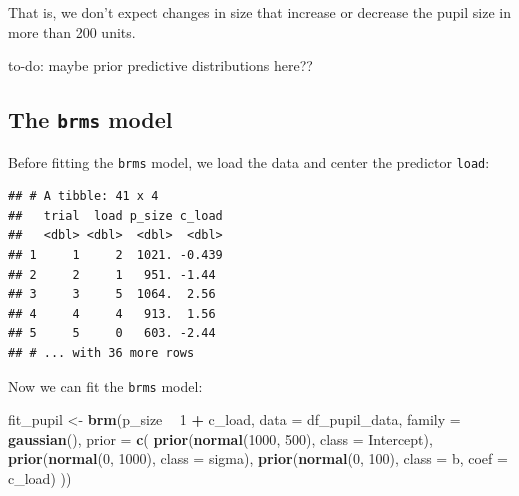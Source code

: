 \documentclass[12pt,]{krantz}
\newenvironment{Shaded}{\begin{snugshade}}{\end{snugshade}}
\newcommand{\DataTypeTok}[1]{\textcolor[rgb]{0.13,0.29,0.53}{#1}}
\newcommand{\DecValTok}[1]{\textcolor[rgb]{0.00,0.00,0.81}{#1}}
\newcommand{\KeywordTok}[1]{\textcolor[rgb]{0.13,0.29,0.53}{\textbf{#1}}}
\newcommand{\NormalTok}[1]{#1}
\newcommand{\OperatorTok}[1]{\textcolor[rgb]{0.81,0.36,0.00}{\textbf{#1}}}
\newcommand{\StringTok}[1]{\textcolor[rgb]{0.31,0.60,0.02}{#1}}
\theoremstyle{definition}
\theoremstyle{definition}
\theoremstyle{definition}
\theoremstyle{remark}
\let\BeginKnitrBlock\begin \let\EndKnitrBlock\end
\begin{document}
That is, we don't expect changes in size that increase or decrease the pupil size in more than 200 units.

\BeginKnitrBlock{rmdnote}
to-do: maybe prior predictive distributions here??
\EndKnitrBlock{rmdnote}

\hypertarget{the-brms-model}{%
\subsection{\texorpdfstring{The \texttt{brms} model}{The brms model}}\label{the-brms-model}}

Before fitting the \texttt{brms} model, we load the data and center the predictor \texttt{load}:

\begin{Shaded}
\end{Shaded}

\begin{verbatim}
## # A tibble: 41 x 4
##   trial  load p_size c_load
##   <dbl> <dbl>  <dbl>  <dbl>
## 1     1     2  1021. -0.439
## 2     2     1   951. -1.44 
## 3     3     5  1064.  2.56 
## 4     4     4   913.  1.56 
## 5     5     0   603. -2.44 
## # ... with 36 more rows
\end{verbatim}

Now we can fit the \texttt{brms} model:

\begin{Shaded}
\begin{Highlighting}[]
\NormalTok{fit_pupil <-}\StringTok{ }\KeywordTok{brm}\NormalTok{(p_size }\OperatorTok{~}\StringTok{ }\DecValTok{1} \OperatorTok{+}\StringTok{ }\NormalTok{c_load,}
                 \DataTypeTok{data =}\NormalTok{ df_pupil_data,}
                 \DataTypeTok{family =} \KeywordTok{gaussian}\NormalTok{(),}
                 \DataTypeTok{prior =} \KeywordTok{c}\NormalTok{(}
                     \KeywordTok{prior}\NormalTok{(}\KeywordTok{normal}\NormalTok{(}\DecValTok{1000}\NormalTok{, }\DecValTok{500}\NormalTok{), }\DataTypeTok{class =}\NormalTok{ Intercept),}
                     \KeywordTok{prior}\NormalTok{(}\KeywordTok{normal}\NormalTok{(}\DecValTok{0}\NormalTok{, }\DecValTok{1000}\NormalTok{), }\DataTypeTok{class =}\NormalTok{ sigma),}
                     \KeywordTok{prior}\NormalTok{(}\KeywordTok{normal}\NormalTok{(}\DecValTok{0}\NormalTok{, }\DecValTok{100}\NormalTok{), }\DataTypeTok{class =}\NormalTok{ b, }\DataTypeTok{coef =}\NormalTok{ c_load)}
\NormalTok{                 )) }
\end{Highlighting}
\end{Shaded}
\end{document}
